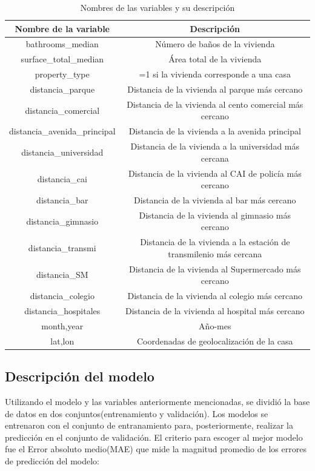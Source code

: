 \documentclass[
  11pt,
  letterpaper,
]{article}
\begin{document}
\begin{table}[ht]
\centering
\caption{Nombres de las variables y su descripción}
\begin{tabular}{|c|c|}
\hline
Nombre de la variable & Descripción  \\
\hline
\hline
bathrooms\_median & Número de baños de la vivienda \\
\hline
surface\_total\_median & Área total de la vivienda  \\
\hline
property\_type & =1 si la vivienda corresponde a una casa \\
\hline
distancia\_parque & Distancia de la vivienda al parque más cercano \\
\hline
distancia\_comercial & Distancia de la vivienda al cento comercial más cercano \\
\hline
distancia\_avenida\_principal & Distancia de la vivienda a la avenida principal\\
\hline
distancia\_universidad & Distancia de la vivienda a la universidad más cercana \\
\hline
distancia\_cai & Distancia de la vivienda al CAI de policía más cercano \\
\hline
distancia\_bar & Distancia de la vivienda al bar más cercano \\
\hline
distancia\_gimnasio & Distancia de la vivienda al gimnasio más cercano \\
\hline
distancia\_transmi & Distancia de la vivienda a la estación de transmilenio más cercana \\
\hline
distancia\_SM & Distancia de la vivienda al Supermercado más cercano \\
\hline
distancia\_colegio & Distancia de la vivienda al colegio más cercano \\
\hline
distancia\_hospitales & Distancia de la vivienda al hospital más cercano \\
\hline
month,year & Año-mes  \\
\hline
lat,lon & Coordenadas de geolocalización de la casa \\
\hline
\end{tabular}
\end{table}

\hypertarget{descripciuxf3n-del-modelo}{%
\subsection{Descripción del modelo}\label{descripciuxf3n-del-modelo}}

Utilizando el modelo y las variables anteriormente mencionadas, se dividió la base de datos en dos conjuntos(entrenamiento y validación). Los modelos se entrenaron con el conjunto de entranamiento para, posteriormente, realizar la predicción en el conjunto de validación. El criterio para escoger al mejor modelo fue el Error absoluto medio(MAE) que mide la magnitud promedio de los errores de predicción del modelo:
\end{document}
